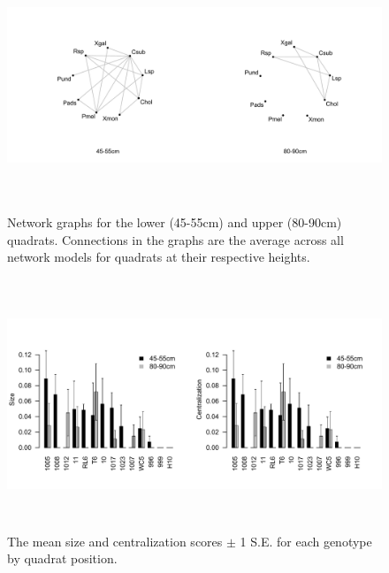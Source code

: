 \documentclass[11pt]{article}
\begin{document}
\newpage

\begin{figure}[h]
\begin{center}
\includegraphics[width=16.5cm,height=7.5cm]{fig2.pdf}
\caption{Network graphs for the lower (45-55cm) and upper (80-90cm) quadrats. Connections in the graphs are the average across all network models for quadrats at their respective heights.}
\end{center}
\end{figure}

\newpage

\begin{figure}[h]
\includegraphics[width=16.5cm,height=7.5cm]{fig3.pdf}
\caption{The mean size and centralization scores  $\pm$ 1 S.E. for each genotype by quadrat position.}
\end{figure}

\newpage
\end{document}
